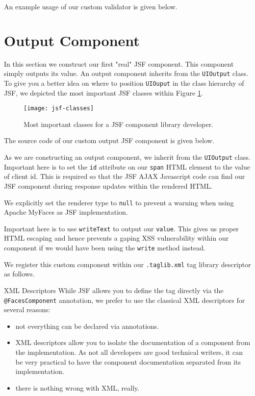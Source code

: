 An example usage of our custom validator is given below.


\section{Output Component}
In this section we construct our first "real" JSF component.
This component simply outputs its value.
An output component inherits from the \texttt{UIOutput} class.
To give you a better idea on where to position \texttt{UIOuput} in the class hierarchy of JSF,
we depicted the most important JSF classes within Figure \ref{fig:jsf-classes}.
\begin{figure}[htbp]
	\begin{center}
		\texttt{[image: jsf-classes]}
		\caption{Most important classes for a JSF component library developer.}
		\label{fig:jsf-classes}
	\end{center}
\end{figure}

The source code of our custom output JSF component is given below.

As we are constructing an output component, we inherit from the \texttt{UIOutput} class.
Important here is to set the \texttt{id} attribute on our \texttt{span} HTML element to the value of client id.
This is required so that the JSF AJAX Javascript code can find our JSF component during response updates within the rendered HTML.

We explicitly set the renderer type to \texttt{null} to prevent a warning when using Apache MyFaces \cite{myfaces} as JSF implementation.

Important here is to use \texttt{writeText} to output our \texttt{value}.
This gives us proper HTML escaping and hence prevents a gaping XSS vulnerability within our component if we would have been using the \texttt{write} method instead.

We register this custom component within our \texttt{.taglib.xml} tag library descriptor as follows.


\begin{TIP}{XML Descriptors}
While JSF allows you to define the tag directly via the \texttt{@FacesComponent} annotation,
we prefer to use the classical XML descriptors for several reasons:
\begin{itemize}
	\item not everything can be declared via annotations.
	\item XML descriptors allow you to isolate the documentation of a component from the implementation.
	As not all developers are good technical writers, it can be very practical to have the component documentation separated from its implementation.
	\item there is nothing wrong with XML, really.
\end{itemize}
\end{TIP}

